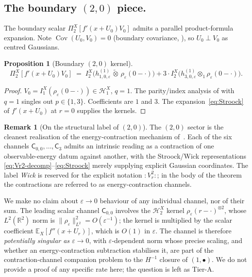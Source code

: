 \documentclass[11pt,reqno]{amsart}
\theoremstyle{plain}
\newtheorem{proposition}[theorem]{Proposition}
\theoremstyle{definition}
\newtheorem{remark}[theorem]{Remark}
\theoremstyle{remark}
\newcommand{\R}{\mathbb{R}}
\newcommand{\E}{\mathbb{E}}
\newcommand{\Hilb}{\mathcal{H}}
\newcommand{\Pir}{\Pi}
\newcommand{\Channel}[1]{\mathsf{C}_{#1}}
\DeclareMathOperator{\Cov}{Cov}
\begin{document}
\subsection*{The boundary \texorpdfstring{$(2,0)$}{(2,0)} piece.}
The boundary scalar $\Pir_2^X[f'(x+U_0)V_0]$ admits a parallel
product-formula expansion. Note $\Cov(U_0,V_0)=0$ (boundary
covariance, \cite[Lem.\ 3.2]{Fontes-FCDC}), so $U_0\perp V_0$ as
centred Gaussians.

\begin{proposition}[Boundary \texorpdfstring{$(2,0)$}{(2,0)} kernel]\label{prop:2-0-bdy}
\[
 \Pir_2^X[f'(x+U_0)V_0]
 \;=\;I_2^X\!\bigl(h^{(1)}_{1,0,\varepsilon}\,\widetilde\otimes\,\rho_\varepsilon(0-\cdot)\bigr)
   +3\cdot I_2^X\!\bigl(h^{(1)}_{3,0,\varepsilon}\otimes_1\rho_\varepsilon(0-\cdot)\bigr).
\]
\end{proposition}

\begin{proof}
$V_0=I_1^X(\rho_\varepsilon(0-\cdot))\in\Hilb_1^X$, $q=1$. The
parity/index analysis of  with $q=1$ singles
out $p\in\{1,3\}$. Coefficients are $1$ and $3$. The
expansion~\eqref{eq:Stroock} of $f'(x+U_0)$ at $r=0$ supplies the
kernels.
\end{proof}

\begin{remark}[On the structural label of \texorpdfstring{$(2,0)$}{(2,0)}]\label{rem:2-0-status}
The $(2,0)$ sector is the cleanest realisation of the
energy-contraction mechanism of~\cite{Fontes-EnergyFirst}. Each of
the six channels $\Channel{0,0},\dots,\Channel{3}$ admits an
intrinsic reading as a contraction of one observable-energy datum
against another, with the Stroock/Wick representations
\eqref{eq:Vr2-decomp}--\eqref{eq:Stroock} merely supplying explicit
Gaussian coordinates. The label \emph{Wick} is reserved for the
explicit notation $:V_r^2:$; in the body of the theorem the
contractions are referred to as energy-contraction channels.

We make no claim about $\varepsilon\to 0$ behaviour of any
individual channel, nor of their sum. The leading scalar channel
$\Channel{0,0}$ involves the $\Hilb_2^X$ kernel
$\rho_\varepsilon(r-\cdot)^{\otimes 2}$, whose $L^{2}(\R^2)$ norm is
$\|\rho_\varepsilon\|_{L^{2}}^2=O(\varepsilon^{-1})$; the kernel is
multiplied by the scalar coefficient $\E_X[f''(x+U_r)]$, which is
$O(1)$ in $\varepsilon$. The channel is therefore \emph{potentially
singular as $\varepsilon\to 0$}, with $\varepsilon$-dependent
norm whose precise scaling, and whether an energy-contraction
subtraction stabilises it, are part of the contraction-channel
companion problem to the $H^{-1}$ closure of $(1,\bullet)$. We do
not provide a proof of any specific rate here; the question is left
as Tier-A.
\end{remark}
\end{document}

